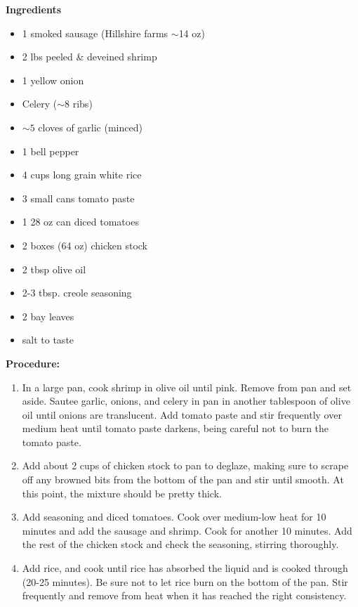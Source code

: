 \bigskip

\bigskip

\begin{multicols}{2}
\textbf{Ingredients}
\begin{itemize}
\item 1 smoked sausage (Hillshire farms $\sim$14 oz) 
\item 2 lbs peeled \& deveined shrimp 
\item 1 yellow onion 
\item Celery ($\sim$8 ribs) 
\item $\sim 5$ cloves of garlic (minced) 
\item 1 bell pepper
\item 4 cups long grain white rice 
\item 3 small cans tomato paste 
\item 1 28 oz can diced tomatoes
\item 2 boxes (64 oz) chicken stock
\item 2 tbsp olive oil
\item 2-3 tbsp. creole seasoning
\item 2 bay leaves 
\item salt to taste





\end{itemize}


\columnbreak
\textbf{Procedure:}
\medskip


\begin{enumerate}
\item In a large pan, cook shrimp in olive oil until pink. Remove from pan and set aside. Sautee garlic, onions, and celery in pan in another tablespoon of olive oil until onions are translucent. Add tomato paste and stir frequently over medium heat until tomato paste darkens, being careful not to burn the tomato paste.


\medskip
\item Add about 2 cups of chicken stock to pan to deglaze, making sure to scrape off any browned bits from the bottom of the pan and stir until smooth. At this point, the mixture should be pretty thick. 
\medskip

\item Add seasoning and diced tomatoes. Cook over medium-low heat for 10 minutes and add the sausage and shrimp. Cook for another 10 minutes. Add the rest of the chicken stock and check the seasoning, stirring thoroughly. 
\newline 

 \item Add rice, and cook until rice has absorbed the liquid and is cooked through (20-25 minutes). Be sure not to let rice burn on the bottom of the pan. Stir frequently and remove from heat when it has reached the right consistency. 
\end{enumerate}


\end{multicols}



